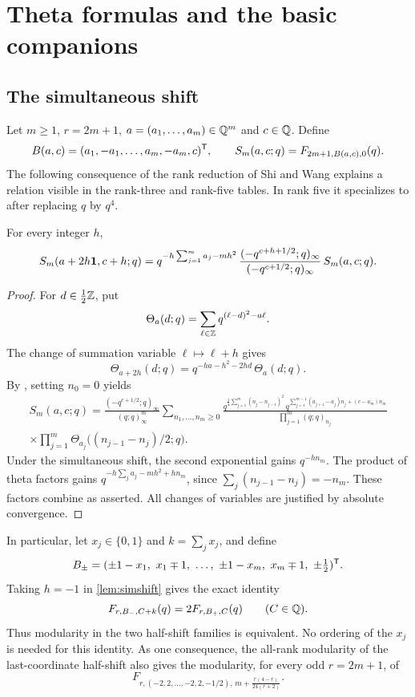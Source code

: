 \section{Theta formulas and the basic companions}\label{sec:theta}

\subsection{The simultaneous shift}
Let $m\ge1$, $r=2m+1$, $a=(a_1,\dots,a_m)\in\mathbb{Q}^m$ and $c\in\mathbb{Q}$. Define
\[
B(a,c)=(a_1,-a_1,\dots,a_m,-a_m,c)^{\mathsf{T}},\qquad S_m(a,c;q)=F_{2m+1,B(a,c),0}(q).
\]
The following consequence of the rank reduction of Shi and Wang explains a relation visible in the rank-three and rank-five tables. In rank five it specializes to \cite[(5.45)]{SW26} after replacing $q$ by $q^4$.

\begin{lemma}\label{lem:simshift}
For every integer $h$,
\begin{equation}\label{eq:simshift}
S_m(a+2h\mathbf{1},c+h;q)=q^{-h\sum_{j=1}^ma_j-mh^2}\,\frac{(-q^{c+h+1/2};q)_\infty}{(-q^{c+1/2};q)_\infty}\,S_m(a,c;q).
\end{equation}
\end{lemma}

\begin{proof}
For $d\in\frac12\mathbb{Z}$, put
\[
\Theta_a(d;q)=\sum_{\ell\in\mathbb{Z}}q^{(\ell-d)^2-a\ell}.
\]
The change of summation variable $\ell\mapsto\ell+h$ gives
\[
\Theta_{a+2h}(d;q)=q^{-ha-h^2-2hd}\,\Theta_a(d;q).
\]
By \cite[Theorem~1.2, (1.11)]{SW26}, setting $n_0=0$ yields
\begin{multline*}
S_m(a,c;q)=\frac{(-q^{c+1/2};q)_\infty}{(q;q)_\infty^m}\sum_{n_1,\dots,n_m\ge0}\frac{q^{\frac14\sum_{j=1}^m(n_j-n_{j-1})^2}\,q^{\sum_{j=1}^{m-1}(a_{j+1}-a_j)n_j+(c-a_m)n_m}}{\prod_{j=1}^m(q;q)_{n_j}}\\
\times\prod_{j=1}^m\Theta_{a_j}\bigl((n_{j-1}-n_j)/2;q\bigr).
\end{multline*}
Under the simultaneous shift, the second exponential gains $q^{-hn_m}$. The product of theta factors gains $q^{-h\sum_ja_j-mh^2+hn_m}$, since $\sum_j(n_{j-1}-n_j)=-n_m$. These factors combine as asserted. All changes of variables are justified by absolute convergence.
\end{proof}

In particular, let $x_j\in\{0,1\}$ and $k=\sum_jx_j$, and define
\[
B_\pm=(\pm1-x_1,\ x_1\mp1,\ \dots,\ \pm1-x_m,\ x_m\mp1,\ \pm\tfrac12)^\T.
\]
Taking $h=-1$ in \cref{lem:simshift} gives the exact identity
\begin{equation}\label{eq:halfshift}
F_{r,B_-,C+k}(q)=2F_{r,B_+,C}(q)\qquad(C\in\mathbb{Q}).
\end{equation}
Thus modularity in the two half-shift families is equivalent. No ordering of the $x_j$ is needed for this identity. As one consequence, the all-rank modularity of the last-coordinate half-shift \cite{CTW26} also gives the modularity, for every odd $r=2m+1$, of
\[
F_{r,(-2,2,\dots,-2,2,-1/2),\,m+\frac{r(4-r)}{24(r+2)}}.
\]

